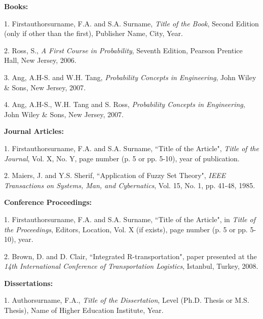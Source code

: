 \documentclass[a4paper,oneside,12pt]{report}
\numberwithin{equation}{chapter}
\begin{document}
\begin{flushleft}

\leftskip 5mm \parindent -5mm \textbf{Books:}

\leftskip 5mm \parindent -5mm 1. Firstauthorsurname, F.A. and S.A. Surname, \textit{Title of the Book}, Second Edition (only if other than the first), Publisher Name, City, Year.

\leftskip 5mm \parindent -5mm 2. Ross, S., \textit{A First Course in Probability}, Seventh Edition, Pearson Prentice Hall, New Jersey, 2006.

\leftskip 5mm \parindent -5mm 3. Ang, A.H-S. and W.H. Tang, \textit{Probability Concepts in Engineering}, John Wiley \& Sons, New Jersey, 2007.

\leftskip 5mm \parindent -5mm 4. Ang, A.H-S., W.H. Tang and S. Ross, \textit{Probability Concepts in Engineering}, John Wiley \& Sons, New Jersey, 2007.\newline


\leftskip 5mm \parindent -5mm \textbf{Journal Articles:}

\leftskip 5mm \parindent -5mm 1. Firstauthorsurname, F.A. and S.A. Surname, ``Title of the Article", \textit{Title of the Journal}, Vol. X, No. Y, page number (p. 5 or pp. 5-10), year of publication.

\leftskip 5mm \parindent -5mm 2. Maiers, J. and Y.S. Sherif, ``Application of Fuzzy Set Theory", \textit{IEEE Transactions on Systems, Man, and Cybernatics}, Vol. 15, No. 1, pp. 41-48, 1985.\newline


\leftskip 5mm \parindent -5mm \textbf{Conference Proceedings:}

\leftskip 5mm \parindent -5mm 1. Firstauthorsurname, F.A. and S.A. Surname, ``Title of the Article", in \textit{Title of the Proceedings}, Editors, Location, Vol. X (if exists), page number (p. 5 or pp. 5-10), year.

\leftskip 5mm \parindent -5mm 2. Brown, D. and D. Clair, ``Integrated R-transportation", paper presented at the \textit{14th International Conference of Transportation Logistics}, Istanbul, Turkey, 2008.\newline

\clearpage
\leftskip 5mm \parindent -5mm \textbf{Dissertations:}

\leftskip 5mm \parindent -5mm 1. Authorsurname, F.A., \textit{Title of the Dissertation}, Level (Ph.D. Thesis or M.S. Thesis), Name of Higher Education Institute, Year.


\end{flushleft}
\end{document}
